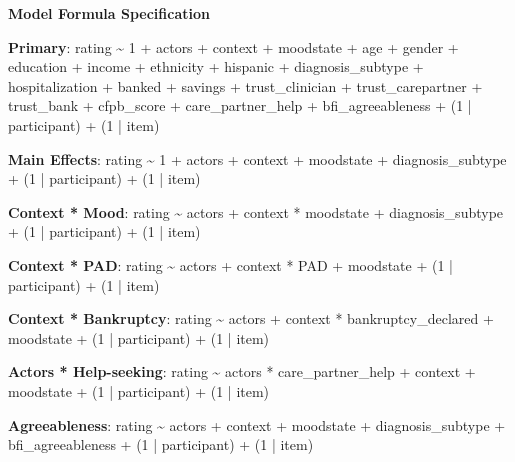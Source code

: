 \begin{TableNotes}[flushleft] %
\item[] \textbf{Model Formula Specification} \\
\item[] \textbf{Primary}: rating \textasciitilde{}  1 + actors + context + moodstate + age + gender + education + income + ethnicity + hispanic + diagnosis\_subtype + hospitalization + banked + savings + trust\_clinician + trust\_carepartner + trust\_bank + cfpb\_score + care\_partner\_help + bfi\_agreeableness + (1 | participant) + (1 | item)
\item[] \textbf{Main Effects}: rating \textasciitilde{} 1 + actors + context + moodstate + diagnosis\_subtype + (1 | participant) + (1 | item)
\item[] \textbf{Context * Mood}: rating \textasciitilde{} actors + context * moodstate + diagnosis\_subtype + (1 | participant) + (1 | item)
\item[] \textbf{Context * PAD}: rating \textasciitilde{} actors + context * PAD + moodstate + (1 | participant) + (1 | item)
\item[] \textbf{Context * Bankruptcy}: rating \textasciitilde{} actors + context * bankruptcy\_declared + moodstate + (1 | participant) + (1 | item)
\item[] \textbf{Actors * Help-seeking}: rating \textasciitilde{} actors * care\_partner\_help + context + moodstate + (1 | participant) + (1 | item)
\item[] \textbf{Agreeableness}: rating \textasciitilde{} actors + context + moodstate + diagnosis\_subtype + bfi\_agreeableness + (1 | participant) + (1 | item)
\end{TableNotes}

